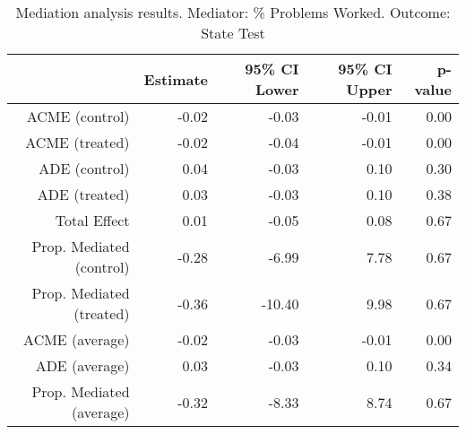 \begin{table}[ht]
\centering
\begin{tabular}{rrrrr}
  \hline
 & Estimate & 95\% CI Lower & 95\% CI Upper & p-value \\ 
  \hline
ACME (control) & -0.02 & -0.03 & -0.01 & 0.00 \\ 
  ACME (treated) & -0.02 & -0.04 & -0.01 & 0.00 \\ 
  ADE (control) & 0.04 & -0.03 & 0.10 & 0.30 \\ 
  ADE (treated) & 0.03 & -0.03 & 0.10 & 0.38 \\ 
  Total Effect & 0.01 & -0.05 & 0.08 & 0.67 \\ 
  Prop. Mediated (control) & -0.28 & -6.99 & 7.78 & 0.67 \\ 
  Prop. Mediated (treated) & -0.36 & -10.40 & 9.98 & 0.67 \\ 
  ACME (average) & -0.02 & -0.03 & -0.01 & 0.00 \\ 
  ADE (average) & 0.03 & -0.03 & 0.10 & 0.34 \\ 
  Prop. Mediated (average) & -0.32 & -8.33 & 8.74 & 0.67 \\ 
   \hline
\end{tabular}
\caption{Mediation analysis results. Mediator: \% Problems Worked. Outcome: State Test} 
\end{table}
